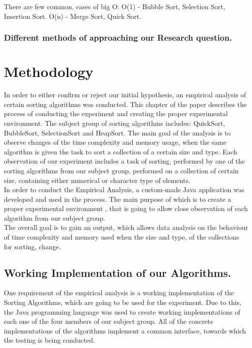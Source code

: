 \documentclass[]{report}
\begin{document}
		There are few common. cases of big O:
		 O(1) - Bubble Sort, Selection Sort, Insertion Sort.
		 O(n) - Merge Sort, Quick Sort.
		\subsubsection{Different methods of approaching our Research question.}
		\clearpage
\section{Methodology}
In order to either confirm or reject our initial hypothesis, an empirical analysis of certain sorting algorithms was conducted. This chapter of the paper describes the process of conducting the experiment and creating the proper experimental environment. The subject group of sorting algorithms includes: QuickSort, BubbleSort, SelectionSort and HeapSort. The main goal of the analysis is to observe changes of the time complexity and memory usage, when the same algorithm is given the task to sort a collection of a certain size and type.
 Each observation of our experiment includes a task of sorting, performed by one of the sorting algorithms from our subject group, performed on a collection of certain size, containing either numerical or character type of elements.\\
In order to conduct the Empirical Analysis, a custom-made Java application was developed and used in the process. The main purpose  of which is to create a proper experimental environment , that is going to allow close observation of each algorithm from our subject group. \\
The overall goal is to gain an output, which allows data analysis on the behaviour of time complexity and memory used when the size and type, of the collections for sorting, change. 
	\subsection{Working Implementation of our Algorithms.}
	One requirement of the empirical analysis is a working implementation of the Sorting Algorithms, which are going to be used for the experiment. Due to this, the Java programming language was used to create working implementations of each one of the four members of our subject group. All of the concrete implementations of the algorithms implement a common interface, towards which the testing is being conducted.
\end{document}
